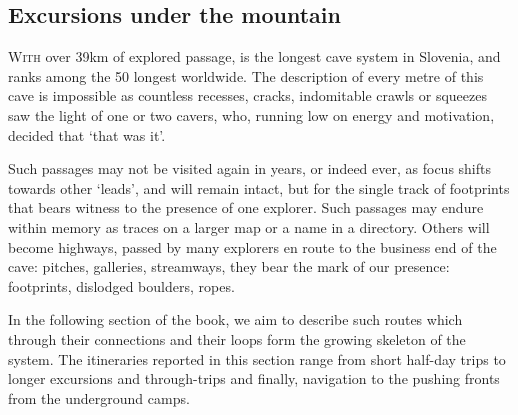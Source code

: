 \begin{tcolorbox}
	\vspace{60pt}
	\part{Excursions under the mountain}
	\lettrine{W}{ith} over 39km of explored passage,  is the longest cave system in Slovenia, and ranks among the 50 longest worldwide. The description of every metre of this cave is impossible as countless recesses, cracks, indomitable crawls or squeezes saw the light of one or two cavers, who, running low on energy and motivation, decided that `that was it'. 

	Such passages may not be visited again in years, or indeed ever, as focus shifts towards other `leads', and will remain intact, but for the single track of footprints that bears witness to the presence of one explorer. Such passages may endure within memory as traces on a larger map or a name in a directory. Others will become highways, passed by many explorers en route to the business end of the cave: pitches, galleries, streamways, they bear the mark of our presence: footprints, dislodged boulders, ropes. 

	In the following section of the book, we aim to describe such routes which through their connections and their loops form the growing skeleton of the system. The itineraries reported in this section range from short half-day trips  to longer excursions and through-trips and finally, navigation to the pushing fronts from the underground camps.
\end{tcolorbox}

